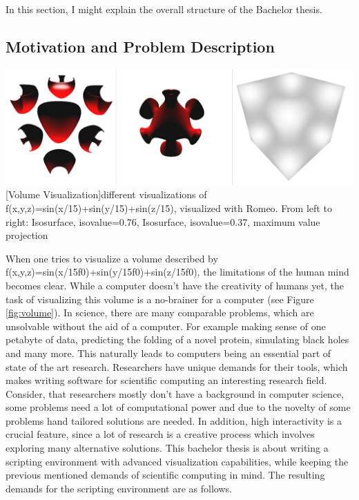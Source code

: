 In this section, I might explain the overall structure of the Bachelor thesis.

\subsection{Motivation and Problem Description}

\vspace{1em}
\begin{minipage}{\linewidth}
    \centering
    \includegraphics[width=0.7\linewidth]{Bilder/surfaces.png}
    [Volume Visualization]{different visualizations of f(x,y,z)=sin(x/15)+sin(y/15)+sin(z/15), visualized with Romeo. From left to right: Isosurface, isovalue=0.76, Isosurface, isovalue=0.37, maximum value projection}
    \label{fig:volume}
\end{minipage}

When one tries to visualize a volume described by f(x,y,z)=sin(x/15f0)+sin(y/15f0)+sin(z/15f0), the limitations of the human mind becomes clear. While a computer doesn't have the creativity of humans yet, the task of visualizing this volume is a no-brainer for a computer (see Figure \ref{fig:volume}).
In science, there are many comparable problems, which are unsolvable without the aid of a computer.
For example making sense of one petabyte of data, predicting the folding of a novel protein, simulating black holes and many more.
This naturally leads to computers being an essential part of state of the art research.
Researchers have unique demands for their tools, which makes writing software for scientific computing an interesting research field.
Consider, that researchers mostly don’t have a background in computer science, some problems need a lot of computational power and due to the novelty of some problems hand tailored solutions are needed. In addition, high interactivity is a crucial feature, since a lot of research is a creative process which involves exploring many alternative solutions.
This bachelor thesis is about writing a scripting environment with advanced visualization capabilities, while keeping the previous mentioned demands of scientific computing in mind.
The resulting demands for the scripting environment are as follows.


